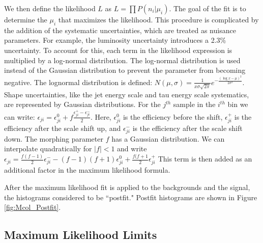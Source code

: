 \documentclass[oneside, letterpaper, oldfontcommands]{memoir}
\begin{document}
\qquad We then define the likelihood $L$ as $L =  \prod P(n_{i}|\mu_{i})$. The goal of the fit is to determine the $\mu_{i}$ that maximizes the likelihood. This procedure is complicated by the addition of the systematic uncertainties, which are treated as nuisance parameters. For example, the luminosity uncertainty\cite{CMS:2011aa} introduces a  2.3\% uncertainty. To account for this, each term in the likelihood expression is multiplied by a log-normal distribution. The log-normal distribution is used instead of the Gaussian distribution to prevent the parameter from becoming negative. 
The lognormal distribution is defined: $N(\mu,\sigma) = \frac{1}{x\sigma \sqrt{2\pi}}e^{-\frac{(\log x - \mu)^{2}}{2\sigma^{2}}}$. 
Shape uncertainties, like the jet energy scale and tau energy scale systematics, are represented by Gaussian distributions. For the $j^{th}$ sample in the $i^{th}$ bin we can write: $\epsilon_{ji} = \epsilon_{ji}^{0} + f \frac{\epsilon_{ji}^{+} - \epsilon_{ji}^{-}}{2}$. Here, $\epsilon_{ji}^{0}$ is the efficiency before the shift, $\epsilon_{ji}^{+}$ is the efficiency after the scale shift up, and $\epsilon_{ji}^{-}$ is the efficiency after the scale shift down. 
The morphing parameter $f$ has a Gaussian distribution. We can interpolate quadratically for $|f|<1$ and write $\epsilon_{ji} = \frac{f (f-1)}{2} \epsilon_{ji}^{-} - (f - 1)(f + 1)\epsilon_{ji}^{0}+\frac{f(f+1}{2}\epsilon_{ji}^{+}$ This term is then added as an additional factor in the maximum likelihood formula. 

\qquad After the maximum likelihood fit is applied to the backgrounds and the signal, the histograms considered to be ``postfit." Postfit histograms are shown in Figure \ref{fig:Mcol_Postfit}. %
\subsection{Maximum Likelihood Limits}
\end{document}
